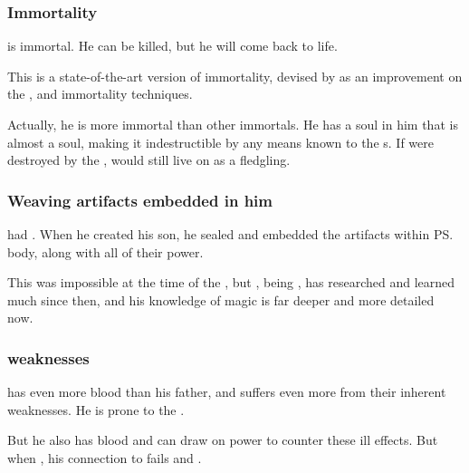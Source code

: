 \subsubsection{Immortality}
\Vizsherioch{} is immortal. 
He can be killed, but he will come back to life. 

This is a state-of-the-art version of immortality, devised by \Secherdamon{} as an improvement on the ,  and  immortality techniques. 

Actually, he is more immortal than other immortals. 
He has a soul in him that is almost a \xsic{} soul, making it indestructible by any means known to the \Miithian s. 
If \Miith{} were destroyed by the \Voidbringer, \Vizsherioch{} would still live on as a \xs{} fledgling. 





\subsubsection{Weaving artifacts embedded in him}
\Secherdamon{} had . 
When he created his son, he sealed and embedded the artifacts within \ps{\Vizsherioch} body, along with all of their power. 

This was impossible at the time of the \SecondShrouding{}, but \Secherdamon, being , has researched and learned much since then, and his knowledge of magic is far deeper and more detailed now.





\subsubsection{\XzaiShannic{} weaknesses}
\Vizsherioch{} has even more \xsic{} blood than his father, and suffers even more from their inherent weaknesses. 
He is prone to the . 

But he also has \bane{} blood and can draw on \Erebean{} power to counter these ill effects. But when , his connection to \Erebos{} fails and . 

